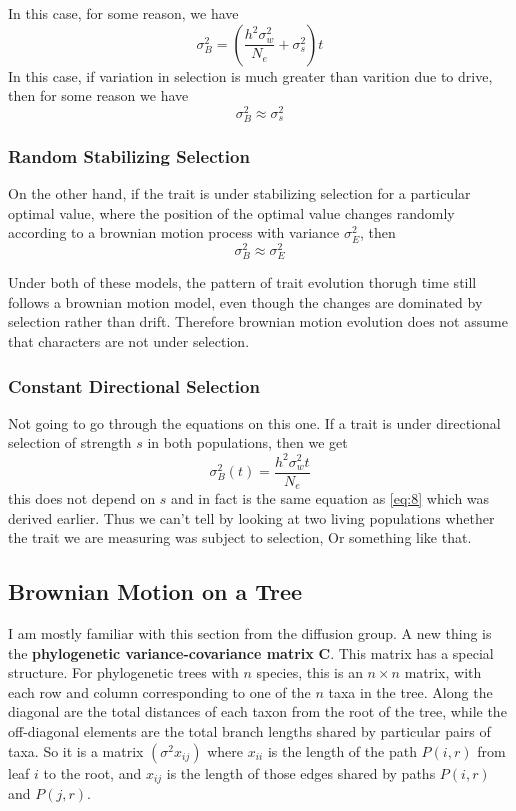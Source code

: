 \documentclass{article}
\newcommand{\bvar}{\sigma_{B}^{2}}  %
\newcommand{\wvar}{\sigma_{w}^{2}}  %
\newcommand{\svar}{\sigma_{s}^{2}}  %
\begin{document}
In this case, for some reason, we have
\begin{equation}
  \label{eq:9}
  \bvar = \left( \frac{h^{2}\wvar}{N_{e}}+ \svar \right)t
\end{equation}
In this case, if variation in selection is much greater than varition due to
drive, then for some reason we have
\begin{equation}
  \label{eq:3}
  \bvar \approx \svar
\end{equation}

\subsubsection{Random Stabilizing Selection}

On the other hand, if the trait is under stabilizing selection for a particular
optimal value, where the position of the optimal value changes randomly
according to a brownian motion process with variance $\sigma_{E}^{2}$, then
\begin{equation*}
  \bvar \approx \sigma^{2}_{E}
\end{equation*}

Under both of these models, the pattern of trait evolution thorugh time still
follows a brownian motion model, even though the changes are dominated by
selection rather than drift. Therefore brownian motion evolution does not assume
that characters are not under selection.

\subsubsection{Constant Directional Selection}

Not going to go through the equations on this one. If a trait is under
directional selection of strength $s$ in both populations, then we get
\begin{equation}
  \label{eq:10}
  \bvar(t) = \frac{h^{2}\wvar t}{N_{e}}
\end{equation}
this does not depend on $s$ and in fact is the same equation as \eqref{eq:8}
which was derived earlier. Thus we can't tell by looking at two living
populations whether the trait we are measuring was subject to selection, Or
something like that.

\subsection{Brownian Motion on a Tree}
I am mostly familiar with this section from the diffusion group. A new thing is
the \textbf{phylogenetic variance-covariance matrix} \textbf{C}. This matrix has a special
structure. For phylogenetic trees with $n$ species, this is an $n\times n$
matrix, with each row and column corresponding to one of the $n$ taxa in the tree.
Along the diagonal are the total distances of each taxon from the root of the
tree, while the off-diagonal elements are the total branch lengths shared by
particular pairs of taxa. So it is a matrix $(\sigma^{2}x_{ij})$ where $x_{ii}$
is the length of the path $P(i,r)$ from leaf $i$ to the root, and $x_{ij}$ is
the length of those edges shared by paths $P(i,r)$ and $P(j,r)$.
\end{document}
